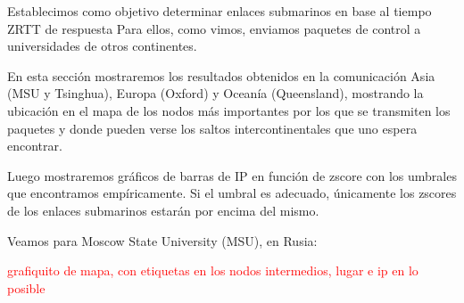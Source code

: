 Establecimos como objetivo determinar enlaces submarinos en base al tiempo ZRTT de respuesta
Para ellos, como vimos, enviamos paquetes de control a universidades de otros continentes.


En esta sección mostraremos los resultados obtenidos en la comunicación 
Asia (MSU y Tsinghua), Europa (Oxford) y Ocean\'ia (Queensland), mostrando la ubicación en 
el mapa de los nodos m\'as importantes por los que se transmiten los paquetes y donde 
pueden verse los saltos intercontinentales que uno espera encontrar.

Luego mostraremos gr\'aficos de barras de IP en funci\'on de zscore con los umbrales que 
encontramos emp\'iricamente. Si el umbral es adecuado, \'unicamente los zscores de los 
enlaces submarinos estar\'an por encima del mismo.

Veamos para Moscow State University (MSU), en Rusia:

\textcolor{red}{grafiquito de mapa, con etiquetas en los nodos intermedios, lugar e ip en lo posible}

